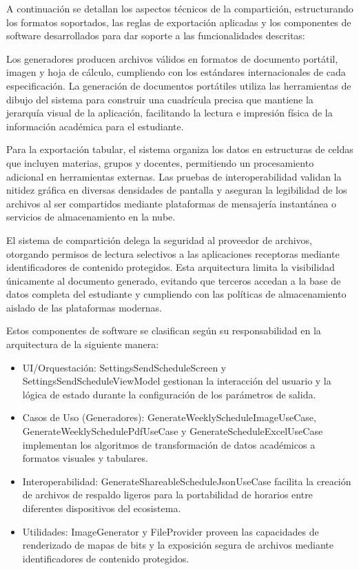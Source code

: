 A continuación se detallan los aspectos técnicos de la compartición, estructurando los formatos soportados, las reglas de exportación aplicadas y los componentes de software desarrollados para dar soporte a las funcionalidades descritas:

Los generadores producen archivos válidos en formatos de documento portátil, imagen y hoja de cálculo, cumpliendo con los estándares internacionales de cada especificación. La generación de documentos portátiles utiliza las herramientas de dibujo del sistema para construir una cuadrícula precisa que mantiene la jerarquía visual de la aplicación, facilitando la lectura e impresión física de la información académica para el estudiante.

Para la exportación tabular, el sistema organiza los datos en estructuras de celdas que incluyen materias, grupos y docentes, permitiendo un procesamiento adicional en herramientas externas. Las pruebas de interoperabilidad validan la nitidez gráfica en diversas densidades de pantalla y aseguran la legibilidad de los archivos al ser compartidos mediante plataformas de mensajería instantánea o servicios de almacenamiento en la nube.

El sistema de compartición delega la seguridad al proveedor de archivos, otorgando permisos de lectura selectivos a las aplicaciones receptoras mediante identificadores de contenido protegidos. Esta arquitectura limita la visibilidad únicamente al documento generado, evitando que terceros accedan a la base de datos completa del estudiante y cumpliendo con las políticas de almacenamiento aislado de las plataformas modernas.

Estos componentes de software se clasifican según su responsabilidad en la arquitectura de la siguiente manera:
\begin{itemize}
  \item UI/Orquestación: SettingsSendScheduleScreen y SettingsSendScheduleViewModel gestionan la interacción del usuario y la lógica de estado durante la configuración de los parámetros de salida.
  \item Casos de Uso (Generadores): GenerateWeeklyScheduleImageUseCase, GenerateWeeklySchedulePdfUseCase y GenerateScheduleExcelUseCase implementan los algoritmos de transformación de datos académicos a formatos visuales y tabulares.
  \item Interoperabilidad: GenerateShareableScheduleJsonUseCase facilita la creación de archivos de respaldo ligeros para la portabilidad de horarios entre diferentes dispositivos del ecosistema.
  \item Utilidades: ImageGenerator y FileProvider proveen las capacidades de renderizado de mapas de bits y la exposición segura de archivos mediante identificadores de contenido protegidos.
\end{itemize}

